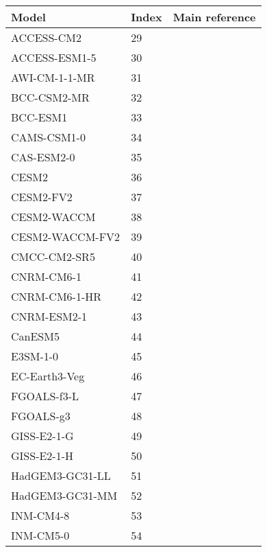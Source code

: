 \begin{table}[p]
  \centering
  \begin{tabulary}{\columnwidth}{L L L}
    \toprule
    Model & Index & Main reference \\
    \midrule
    ACCESS-CM2 & 29 & \textcite{Bi2013} \\
    ACCESS-ESM1-5 & 30 & \textcite{Law2017, Ziehn2017} \\
    AWI-CM-1-1-MR & 31 & \textcite{Rackow2018, Sidorenko2015} \\
    BCC-CSM2-MR & 32 & \textcite{Wu2019} \\
    BCC-ESM1 & 33 & \textcite{Wu2019} \\
    CAMS-CSM1-0 & 34 & \textcite{Rong2018} \\
    CAS-ESM2-0 & 35 & \textcite{Wang2020} \\
    CESM2 & 36 & \textcite{Danabasoglu2020} \\
    CESM2-FV2 & 37 & \textcite{Danabasoglu2020} \\
    CESM2-WACCM & 38 & \textcite{Danabasoglu2020, Gettelman2019a} \\
    CESM2-WACCM-FV2 & 39 & \textcite{Danabasoglu2020, Gettelman2019a} \\
    CMCC-CM2-SR5 & 40 & \textcite{Cherchi2019} \\
    CNRM-CM6-1 & 41 & \textcite{Voldoire2019} \\
    CNRM-CM6-1-HR & 42 & \textcite{Voldoire2019} \\
    CNRM-ESM2-1 & 43 & \textcite{Seferian2019} \\
    CanESM5 & 44 & \textcite{Swart2019} \\
    E3SM-1-0 & 45 & \textcite{Golaz2019} \\
    EC-Earth3-Veg & 46 & \textcite{Wyser2020} \\
    FGOALS-f3-L & 47 & \textcite{Guo2020, He2019, He2020} \\
    FGOALS-g3 & 48 & \textcite{Li2020} \\
    GISS-E2-1-G & 49 & \textcite{Rind2020} \\
    GISS-E2-1-H & 50 & \textcite{Rind2020} \\
    HadGEM3-GC31-LL & 51 & \textcite{Kuhlbrodt2018} \\
    HadGEM3-GC31-MM & 52 & \textcite{Williams2018} \\
    INM-CM4-8 & 53 & \textcite{Volodin2017,Volodin2017a} \\
    INM-CM5-0 & 54 & \textcite{Volodin2017,Volodin2017a} \\

\end{tabulary}
\end{table}
